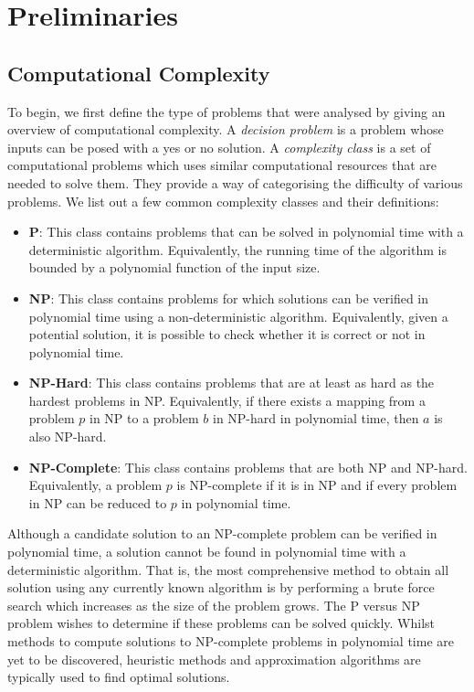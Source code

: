 \section{Preliminaries} \label{sec:prelim}

\subsection{Computational Complexity}

    To begin, we first define the type of problems that were analysed by giving an overview of computational complexity. A \emph{decision problem} is a problem whose inputs can be posed with a yes or no solution. A \emph{complexity class} is a set of computational problems which uses similar computational resources that are needed to solve them. They provide a way of categorising the difficulty of various problems. We list out a few common complexity classes and their definitions:
    \begin{itemize}
        \item \textbf{P}: This class contains problems that can be solved in polynomial time with a deterministic algorithm. Equivalently, the running time of the algorithm is bounded by a polynomial function of the input size.
        \item \textbf{NP}: This class contains problems for which solutions can be verified in polynomial time using a non-deterministic algorithm. Equivalently, given a potential solution, it is possible to check whether it is correct or not in polynomial time.
        \item \textbf{NP-Hard}: This class contains problems that are at least as hard as the hardest problems in NP. Equivalently, if there exists a mapping from a problem $p$ in NP to a problem $b$ in NP-hard in polynomial time, then $a$ is also NP-hard.
        \item \textbf{NP-Complete}: This class contains problems that are both NP and NP-hard. Equivalently, a problem $p$ is NP-complete if it is in NP and if every problem in NP can be reduced to $p$ in polynomial time.
        
    \end{itemize}

    Although a candidate solution to an NP-complete problem can be verified in polynomial time, a solution cannot be found in polynomial time with a deterministic algorithm. That is, the most comprehensive method to obtain all solution using any currently known algorithm is by performing a brute force search which increases as the size of the problem grows. The P versus NP problem wishes to determine if these problems can be solved quickly. Whilst methods to compute solutions to NP-complete problems in polynomial time are yet to be discovered, heuristic methods and approximation algorithms are typically used to find optimal solutions.



